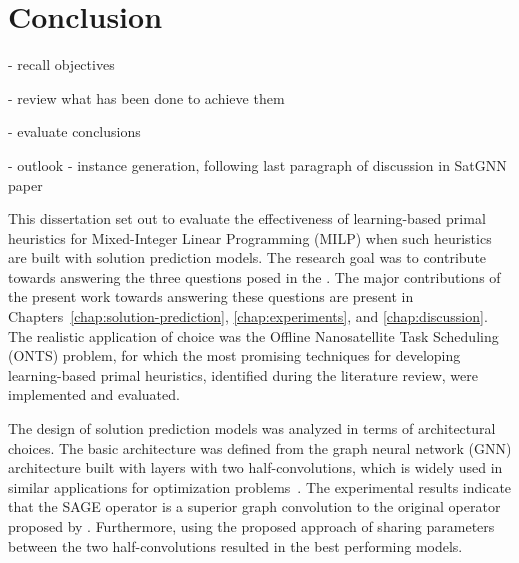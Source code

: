 % 

\chapter*{Conclusion}\label{conclusion}

- recall objectives

- review what has been done to achieve them

- evaluate conclusions

- outlook
    - instance generation, following last paragraph of discussion in SatGNN paper


This dissertation set out to evaluate the effectiveness of learning-based primal heuristics for Mixed-Integer Linear Programming (MILP) when such heuristics are built with solution prediction models.
The research goal was to contribute towards answering the three questions posed in the .
The major contributions of the present work towards answering these questions are present in Chapters~\ref{chap:solution-prediction}, \ref{chap:experiments}, and \ref{chap:discussion}.
The realistic application of choice was the Offline Nanosatellite Task Scheduling (ONTS) problem, for which the most promising techniques for developing learning-based primal heuristics, identified during the literature review, were implemented and evaluated.

The design of solution prediction models was analyzed in terms of architectural choices.
The basic architecture was defined from the graph neural network (GNN) architecture built with layers with two half-convolutions, which is widely used in similar applications for optimization problems~\cite{gasseExactCombinatorialOptimization2019,nairSolvingMixedInteger2021,khalilMIPGNNDataDrivenFramework2022,cappartCombinatorialOptimizationReasoning2022}.
The experimental results indicate that the SAGE operator is a superior graph convolution to the original operator proposed by .
Furthermore, using the proposed approach of sharing parameters between the two half-convolutions resulted in the best performing models.

